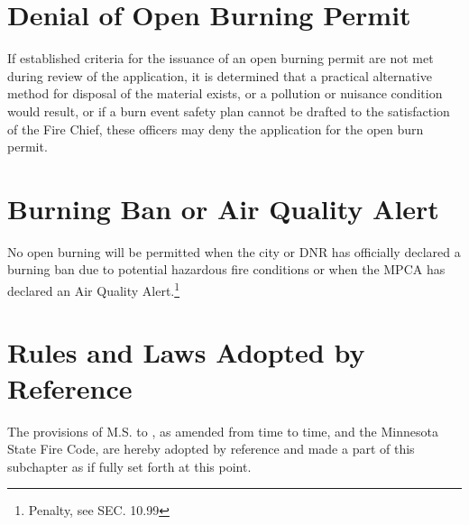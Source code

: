 \section{Denial of Open Burning Permit}
If established criteria for the issuance of an open burning permit are not met during review of the application, it is determined that a practical alternative method for disposal of the material exists, or a pollution or nuisance condition would result, or if a burn event safety plan cannot be drafted to the satisfaction of the Fire Chief, these officers may deny the application for the open burn permit.

\section{Burning Ban or Air Quality Alert}
No open burning  will be permitted when the city or DNR has officially declared a burning ban due to potential hazardous fire conditions or when the MPCA has declared an Air Quality Alert.\footnote{Penalty, see SEC. 10.99}

\section{Rules and Laws Adopted by Reference}
The provisions of M.S.  to , as amended from time to time, and the Minnesota State Fire Code, are hereby adopted by reference and made a part of this subchapter as if fully set forth at this point.
